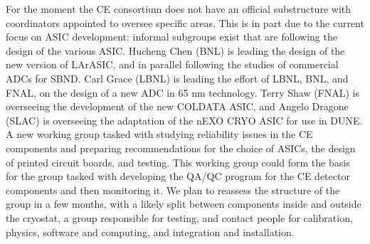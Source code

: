 For the moment the CE consortium does not have an official substructure
with coordinators appointed to oversee specific areas. This is in part due
to the current focus on ASIC development: informal subgroups exist that
are following the design of the various ASIC. Hucheng Chen (BNL) is leading the
design of the new version of LArASIC, and in parallel following the studies
of commercial ADCs for SBND. Carl Grace (LBNL) is leading the effort of
LBNL, BNL, and FNAL, on the design of a new ADC in 65 nm technology. Terry
Shaw (FNAL) is overseeing the development of the new COLDATA ASIC, and
Angelo Dragone (SLAC) is overseeing the adaptation of the nEXO CRYO ASIC
for use in DUNE. A new working group tasked with studying reliability
issues in the CE components and preparing recommendations for the choice
of ASICs, the design of printed circuit boards, and testing. This working
group could form the basis for the group tasked with developing the QA/QC
program for the CE detector components and then monitoring it. We plan to
reassess the structure of the group in a few months, with a likely split
between components inside and outside the cryostat, a group responsible
for testing, and contact people for calibration, physics, software and
computing, and integration and installation.
